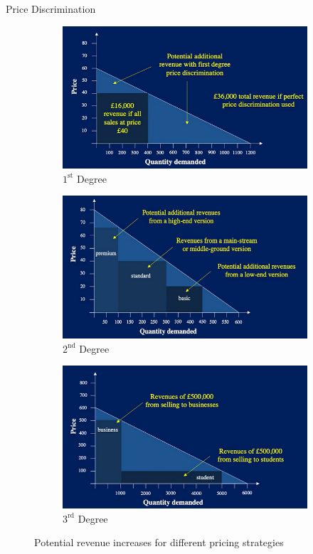 \documentclass[11pt,a4paper]{article}
\begin{document}
\begin{definition}{Price Discrimination}
    \begin{figure}[ht!]
      \centering
      \begin{subfigure}[b]{.3\textwidth}
           \centering
           \includegraphics[width=\textwidth]{personalisedPricing.PNG}
           \caption{$1^\text{st}$ Degree}
      \end{subfigure}
      \begin{subfigure}[b]{.3\textwidth}
          \centering
          \includegraphics[width=\textwidth]{versioningPricing.PNG}
          \caption{$2^\text{nd}$ Degree}
      \end{subfigure}
      \begin{subfigure}[b]{.3\textwidth}
           \centering
           \includegraphics[width=\textwidth]{groupPricing.PNG}
           \caption{$3^\text{rd}$ Degree}
       \end{subfigure}
      \caption{Potential revenue increases for different pricing strategies}
    \end{figure}


\end{definition}
\end{document}
